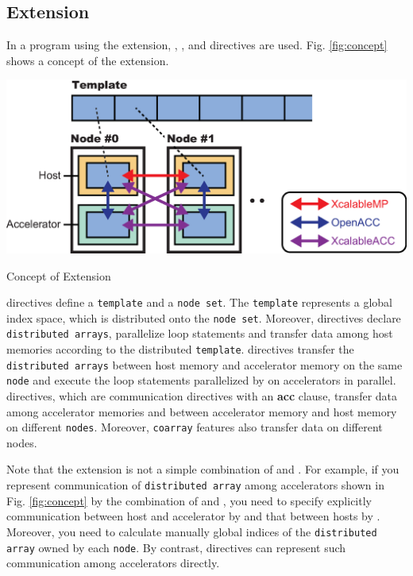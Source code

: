 \subsection{{\XMP} Extension}
In a program using the {\XMP} extension,
{\XMP}, {\OACC}, and {\XACC} directives are used.
Fig. \ref{fig:concept} shows a concept of the {\XMP} extension.

\begin{myfigure}
\includegraphics[scale=0.5,clip]{figs/concept.eps}
  \caption{Concept of {\XMP} Extension}\label{fig:concept}
\end{myfigure}

{\XMP} directives define a {\tt template} and a {\tt node set}.
The {\tt template} represents a global index space, which is distributed onto the {\tt node set}.
Moreover, {\XMP} directives declare {\tt distributed arrays},
parallelize loop statements and transfer data among host memories according to the distributed {\tt template}.
{\OACC} directives transfer the {\tt distributed arrays} between host memory and accelerator memory on the same {\tt node}
and execute the loop statements parallelized by {\XMP} on accelerators in parallel.
{\XACC} directives, which are {\XMP} communication directives with an {\bf acc} clause, 
transfer data among accelerator memories and between accelerator memory and host memory on different {\tt nodes}.
Moreover, 
{\tt coarray} features also transfer data on different nodes.

Note that 
the {\XMP} extension is not a simple combination of {\XMP} and {\OACC}.
For example, 
if you represent communication of {\tt distributed array} among accelerators shown in Fig. \ref{fig:concept} by the combination of {\XMP} and {\OACC},
you need to specify explicitly communication between host and accelerator by {\OACC} and that between hosts by {\XMP}.
Moreover,
you need to calculate manually global indices of the {\tt distributed array} owned by each {\tt node}.
By contrast,
{\XACC} directives can represent such communication among accelerators directly.

